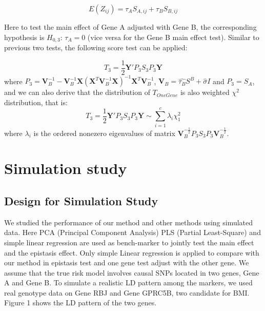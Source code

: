 \documentclass{article}
\newcommand{\Y}{\mathbf{Y}}
\newcommand{\X}{\mathbf{X}}
\newcommand{\V}{\mathbf{V}}
\newcommand{\VV}{\mathbf{V}^{-1}}
\begin{document}
        \[
            E(Z_{ij})=\tau_AS_{A,ij}+\tau_BS_{B,ij}
        \]

        Here to test the main effect of Gene A adjusted with Gene B, the corresponding hypothesis is $H_{0,3}$: $\tau_A=0$ (vice versa for the Gene B main effect test). Similar to previous two tests, the following score test can be applied:

        \[
            T_3=\frac{1}{2}\Y'P_3S_3P_3\Y
        \]
        where $P_3=\VV_B-\VV_B\X(\X^T\VV_B\X)^{-1}\X^T\VV_B$, $\V_B=\hat{\tau_B}S^B+\hat{\sigma}I$ and $P_3=S_A$, and we can also derive that the distribution of $T_{OneGene}$ is also weighted $\chi^2$ distribution, that is:
        \[
            T_3=\frac{1}{2}\Y'P_3S_3P_3\Y\sim\sum_{i=1}^c\lambda_i\chi^2_1
        \]
        where $\lambda_i$ is the  ordered nonezero eigenvalues of matrix $\V_B^{-\frac{1}{2}}P_3S_3P_3\V_B^{-\frac{1}{2}}$.

    \section{Simulation study}
        \subsection{Design for Simulation Study}

        We studied the performance of our method and other methods using simulated data.
        Here PCA (Principal Component Analysis) PLS (Partial Least-Square) and simple linear regression are used as bench-marker to jointly test the main effect and the epistasis effect. Only simple Linear regression is applied to compare with our method in epistasis test and one gene test adjust with the other gene.
        We assume that the true risk model involves causal SNPs located in two genes, Gene A and Gene B. To simulate a realistic LD pattern among the markers, we used real genotype data on Gene RBJ and Gene GPRC5B, two candidate for BMI. Figure 1 shows the LD pattern of the two genes.
\end{document}
